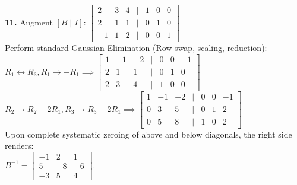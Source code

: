 \documentclass{article}
\begin{document}
\vspace{5pt}
\noindent
\textbf{11.} Augment $[B \mid I]$:
$\begin{bmatrix} 2 & 3 & 4 & \mid & 1 & 0 & 0 \\ 2 & 1 & 1 & \mid & 0 & 1 & 0 \\ -1 & 1 & 2 & \mid & 0 & 0 & 1 \end{bmatrix}$ \\
Perform standard Gaussian Elimination (Row swap, scaling, reduction): \\
$R_1 \leftrightarrow R_3, R_1 \to -R_1 \implies \begin{bmatrix} 1 & -1 & -2 & \mid & 0 & 0 & -1 \\ 2 & 1 & 1 & \mid & 0 & 1 & 0 \\ 2 & 3 & 4 & \mid & 1 & 0 & 0 \end{bmatrix}$ \\
$R_2 \to R_2 - 2R_1, R_3 \to R_3 - 2R_1 \implies \begin{bmatrix} 1 & -1 & -2 & \mid & 0 & 0 & -1 \\ 0 & 3 & 5 & \mid & 0 & 1 & 2 \\ 0 & 5 & 8 & \mid & 1 & 0 & 2 \end{bmatrix}$ \\
Upon complete systematic zeroing of above and below diagonals, the right side renders: \\
$B^{-1} = \begin{bmatrix} -1 & 2 & 1 \\ 5 & -8 & -6 \\ -3 & 5 & 4 \end{bmatrix}$.
\end{document}
